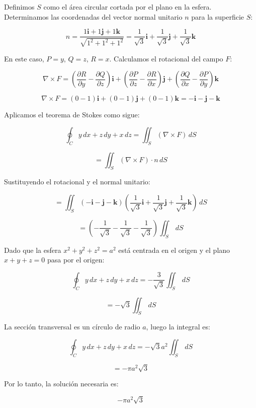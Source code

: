 \documentclass{report}
\begin{document}
Definimos \( S \) como el área circular cortada por el plano en la esfera. Determinamos las coordenadas del vector normal unitario \( n \) para la superficie \( S \):

\[
n = \frac{1 \mathbf{i} + 1 \mathbf{j} + 1 \mathbf{k}}{\sqrt{1^2 + 1^2 + 1^2}} = \frac{1}{\sqrt{3}} \mathbf{i} + \frac{1}{\sqrt{3}} \mathbf{j} + \frac{1}{\sqrt{3}} \mathbf{k}
\]


En este caso, \( P = y \), \( Q = z \), \( R = x \). Calculamos el rotacional del campo \( F \):

\[
\nabla \times F = \left( \frac{\partial R}{\partial y} - \frac{\partial Q}{\partial z} \right) \mathbf{i} + \left( \frac{\partial P}{\partial z} - \frac{\partial R}{\partial x} \right) \mathbf{j} + \left( \frac{\partial Q}{\partial x} - \frac{\partial P}{\partial y} \right) \mathbf{k}
\]

\[
\nabla \times F = (0 - 1) \mathbf{i} + (0 - 1) \mathbf{j} + (0 - 1) \mathbf{k} = -\mathbf{i} - \mathbf{j} - \mathbf{k}
\]


Aplicamos el teorema de Stokes como sigue:

\[
\oint_C y \, dx + z \, dy + x \, dz = \iint_S (\nabla \times F) \, dS
\]

\[
= \iint_S (\nabla \times F) \cdot n \, dS
\]

Sustituyendo el rotacional y el normal unitario:

\[
= \iint_S (-\mathbf{i} - \mathbf{j} - \mathbf{k}) \left( \frac{1}{\sqrt{3}} \mathbf{i} + \frac{1}{\sqrt{3}} \mathbf{j} + \frac{1}{\sqrt{3}} \mathbf{k} \right) \, dS
\]

\[
= \left( -\frac{1}{\sqrt{3}} - \frac{1}{\sqrt{3}} - \frac{1}{\sqrt{3}} \right) \iint_S \, dS
\]

Dado que la esfera \( x^2 + y^2 + z^2 = a^2 \) está centrada en el origen y el plano \( x + y + z = 0 \) pasa por el origen:

\[
\oint_C y \, dx + z \, dy + x \, dz = -\frac{3}{\sqrt{3}} \iint_S \, dS
\]

\[
= -\sqrt{3} \iint_S \, dS
\]

La sección transversal es un círculo de radio \( a \), luego la integral es:

\[
\oint_C y \, dx + z \, dy + x \, dz = -\sqrt{3} a^2 \iint_S \, dS
\]

\[
= -\pi a^2 \sqrt{3}
\]

Por lo tanto, la solución necesaria es:

\[
{-\pi a^2 \sqrt{3}}
\]
\end{document}

